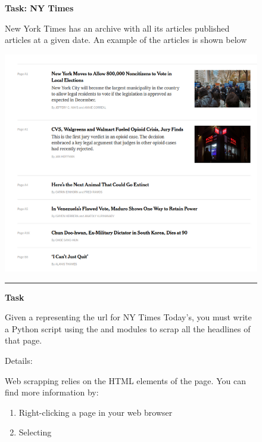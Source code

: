 

\begin{figure}
\begin{mdframed}[backgroundcolor=gray!04] 
\begin{scriptsize}

{\large \textbf{Task: NY Times}} \bigskip


New York Times has an archive with all its articles published articles at a given date. An example of the articles is shown below

\medskip

\includegraphics[width=\textwidth]{appendix/cp6/rsz_nytimes.png}

\medskip

\begin{center}
\rule{10cm}{0.4pt}
\end{center}

\textbf{Task} \medskip



Given a  representing the url for NY Times Today's, you must write a Python script using the  and  modules to scrap all the headlines of that page. \medskip



Details:\medskip


Web scrapping relies on the HTML elements of the page. You can find more information by:

\begin{enumerate}


    \item  Right-clicking a page in your web browser

    \item  Selecting 


\end{enumerate}

\end{scriptsize}
\end{mdframed}
\end{figure}
  


